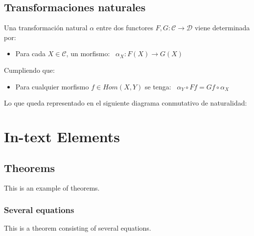 \documentclass[11pt, fleqn, spanish]{book}
\newcommand{\C}{\mathcal{C} }
\begin{document}
\section {Transformaciones naturales}
  \begin{definition} 
    Una transformación natural $\alpha$ entre dos functores $F,G: \C \rightarrow \mathcal{D}$
    viene determinada por:
    \begin{itemize}
    \item Para cada $X \in \C$, un morfismo: \, $\alpha_X : F(X) \rightarrow G(X)$
    \end{itemize}
    Cumpliendo que:
    \begin{itemize}
    \item Para cualquier morfismo $f \in Hom(X,Y)$ se tenga: \, $\alpha_Y \circ Ff = Gf \circ \alpha_X$
    \end{itemize}
  \end{definition}
  Lo que queda representado en el siguiente diagrama conmutativo de naturalidad:
  \begin{center}
  \end{center}
 

\chapter{In-text Elements}

\section{Theorems}

This is an example of theorems.

\subsection{Several equations}
This is a theorem consisting of several equations.
\end{document}
